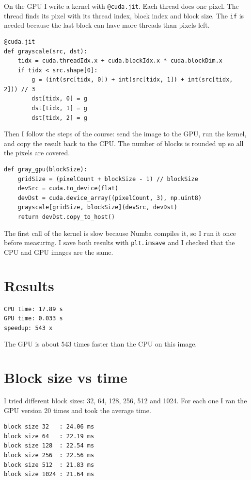 \documentclass{report}
\begin{document}
On the GPU I write a kernel with \texttt{@cuda.jit}. Each thread does one pixel. The thread
finds its pixel with its thread index, block index and block size. The \texttt{if} is needed
because the last block can have more threads than pixels left.

\begin{verbatim}
@cuda.jit
def grayscale(src, dst):
    tidx = cuda.threadIdx.x + cuda.blockIdx.x * cuda.blockDim.x
    if tidx < src.shape[0]:
        g = (int(src[tidx, 0]) + int(src[tidx, 1]) + int(src[tidx, 2])) // 3
        dst[tidx, 0] = g
        dst[tidx, 1] = g
        dst[tidx, 2] = g
\end{verbatim}

Then I follow the steps of the course: send the image to the GPU, run the kernel, and copy
the result back to the CPU. The number of blocks is rounded up so all the pixels are covered.

\begin{verbatim}
def gray_gpu(blockSize):
    gridSize = (pixelCount + blockSize - 1) // blockSize
    devSrc = cuda.to_device(flat)
    devDst = cuda.device_array((pixelCount, 3), np.uint8)
    grayscale[gridSize, blockSize](devSrc, devDst)
    return devDst.copy_to_host()
\end{verbatim}

The first call of the kernel is slow because Numba compiles it, so I run it once before
measuring. I save both results with \texttt{plt.imsave} and I checked that the CPU and GPU
images are the same.

\section*{Results}

\begin{verbatim}
CPU time: 17.89 s
GPU time: 0.033 s
speedup: 543 x
\end{verbatim}

The GPU is about 543 times faster than the CPU on this image.

\section*{Block size vs time}

I tried different block sizes: 32, 64, 128, 256, 512 and 1024. For each one I ran the GPU
version 20 times and took the average time.

\begin{verbatim}
block size 32   : 24.06 ms
block size 64   : 22.19 ms
block size 128  : 22.54 ms
block size 256  : 22.56 ms
block size 512  : 21.83 ms
block size 1024 : 21.64 ms
\end{verbatim}
\end{document}
